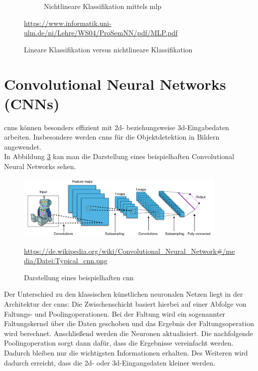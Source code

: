 \begin{figure}[H]
\begin{subfigure}[b]{0.3\textwidth}
		\caption{Nichtlineare Klassifikation mittels \acs{mlp}}
		\label{non-linear-classification}
	\end{subfigure}
	\caption{Lineare Klassifikation versus nichtlineare Klassifikation}
	\quelle\url{https://www.informatik.uni-ulm.de/ni/Lehre/WS04/ProSemNN/pdf/MLP.pdf}
\end{figure}

\section{Convolutional Neural Networks (CNNs)}

	\acf{cnns} können besonders effizient mit \acs{2d}- beziehungsweise \acs{3d}-Eingabedaten arbeiten. Insbesondere werden \acs{cnns} für die Objektdetektion in Bildern angewendet. \cite{datasolut4} \\
	In Abbildung \ref{cnn} kan man die Darstellung eines beispielhaften Convolutional Neural Networks sehen.
	
	\begin{figure}[H]
		\centering
		\includegraphics[width=0.9\textwidth]{kapitel3/images/cnn.png}
		\caption{Darstellung eines beispielhaften \acs{cnn}}
		\label{cnn}
		\vspace{0.2cm}
		\quelle\url{https://de.wikipedia.org/wiki/Convolutional_Neural_Network#/media/Datei:Typical_cnn.png}
	\end{figure}

	Der Unterschied zu den klassischen künstlichen neuronalen Netzen liegt in der Architektur der \acs{cnns}: Die Zwischenschicht basiert hierbei auf einer Abfolge von Faltungs- und Poolingoperationen. Bei der Faltung wird ein sogenannter Faltungskernel über die Daten geschoben und das Ergebnis der Faltungsoperation wird berechnet. Anschließend werden die Neuronen aktualisiert. Die nachfolgende Poolingoperation sorgt dann dafür, dass die Ergebnisse vereinfacht werden. Dadurch bleiben nur die wichtigsten Informationen erhalten.	Des Weiteren wird dadurch erreicht, dass die \acs{2d}- oder \acs{3d}-Eingangsdaten kleiner werden. \cite{datasolut4}



